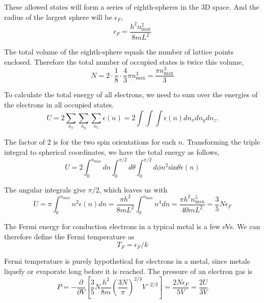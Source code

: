 These allowed states will form a series of eighth-spheres in the 3D space. And the radius of the largest sphere will be $\epsilon_F$,
\begin{equation}
\epsilon_F = \frac{h^2n_\textrm{max}^2}{8mL^2}
\end{equation}

The total volume of the eighth-sphere equals the number of lattice points enclosed. Therefore the total number of occupied states is
twice this volume,
\begin{equation}
N = 2 \cdot \frac{1}{8} \cdot \frac{4}{3} \pi n_\textrm{max}^3 = \frac{\pi n_\textrm{max}^3}{3}
\end{equation}

To calculate the total energy of all electrons, we need to sum over the energies of the electrons in all occupied states.
\begin{equation}
U = 2 \sum_{n_x} \sum_{n_y} \sum_{n_z}\epsilon(n)  = 2 \int\int\int \epsilon(n) dn_x dn_y dn_z.
\end{equation}

The factor of 2 is for the two spin orientations for each $n$. 
Transforming the triple integral to spherical coordinates, we have the total energy as follows,
\begin{equation}
U = 2 \int_0^{n_\textrm{max}} dn \int_0 ^{\pi/2} d\theta \int_0 ^{\pi/2} d\phi n^2 \textrm{sin}\theta \epsilon(n)
\end{equation}

The angular integrals give $\pi/2$, which leaves us with
\begin{equation}
U = \pi \int_0^{n_\textrm{max}} n^2 \epsilon(n) dn 
  = \frac{\pi h^2}{8mL^2} \int _0 ^{n_\textrm{max}} n^4 dn
  = \frac{\pi h^2 n^5_\textrm{max}}{40mL^2} 
  = \frac{3}{5} N \epsilon_F
\end{equation}

The Fermi energy for conduction electrons in a typical metal is a few eVs.
We can therefore define the Fermi temperature as
\begin{equation}
T_F = \epsilon_F/k
\end{equation}

Fermi temperature is purely hypothetical for electrons in a metal, since metals liquefy or evaporate long before it is reached.
The pressure of an electron gas is
\begin{equation}
P = -\frac{\partial}{\partial V} [\frac{3}{5}N \frac{h^2}{8m} (\frac{3N}{\pi})^{2/3} V^{-2/3}] 
  = \frac{2N\epsilon_F}{5V} = \frac{2U}{3V}
\end{equation}

